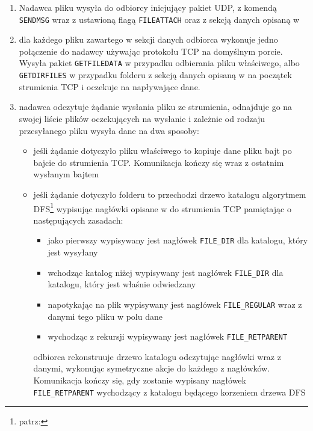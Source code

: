 \documentclass[11pt,leqno]{article}
\begin{document}
\begin{enumerate}
	\item Nadawca pliku wysyła do odbiorcy inicjujący pakiet UDP, z komendą \texttt{SENDMSG}
	wraz z ustawioną flagą \texttt{FILEATTACH} oraz z sekcją danych opisaną w 
	\item dla każdego pliku zawartego w sekcji danych odbiorca wykonuje jedno połączenie
	do nadawcy używając protokołu TCP na domyślnym porcie. Wysyła pakiet \texttt{GETFILEDATA}
	w przypadku odbierania pliku właściwego, albo \texttt{GETDIRFILES} w przypadku folderu
	z sekcją danych opisaną w  na początek strumienia TCP i oczekuje na
	napływające dane.
	\item nadawca odczytuje żądanie wysłania pliku ze strumienia, odnajduje go na swojej liście plików oczekujących
	na wysłanie i zależnie od rodzaju przesyłanego pliku wysyła dane na dwa sposoby:
	\begin{itemize}
		\item jeśli żądanie dotyczyło pliku właściwego to kopiuje dane pliku bajt po bajcie do
		strumienia TCP. Komunikacja kończy się wraz z ostatnim wysłanym bajtem
		\item jeśli żądanie dotyczyło folderu to przechodzi drzewo katalogu algorytmem DFS\footnote{patrz: }
		wypisując nagłówki opisane w  do strumienia TCP
		pamiętając o następujących zasadach:
		\begin{itemize}
			\item jako pierwszy wypisywany jest nagłówek \texttt{FILE\_DIR} dla
			katalogu, który jest wysyłany
			\item wchodząc katalog niżej wypisywany jest nagłówek \texttt{FILE\_DIR} dla katalogu,
			który jest właśnie odwiedzany
			\item napotykając na plik wypisywany jest nagłówek \texttt{FILE\_REGULAR}
			wraz z danymi tego pliku w polu dane
			\item wychodząc z rekursji wypisywany jest nagłówek \texttt{FILE\_RETPARENT}
		\end{itemize}
		odbiorca rekonstruuje drzewo katalogu odczytując nagłówki wraz z danymi,
		wykonując symetryczne akcje do każdego z nagłówków. Komunikacja kończy się, gdy
		zostanie wypisany nagłówek \texttt{FILE\_RETPARENT} wychodzący z katalogu
		będącego korzeniem drzewa DFS
	\end{itemize}
\end{enumerate}
\end{document}
